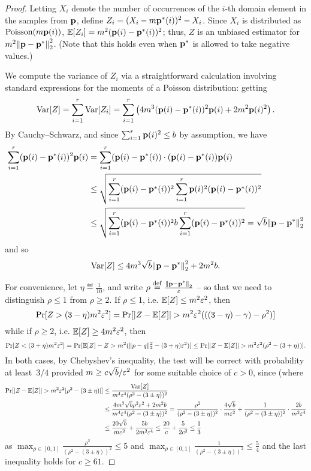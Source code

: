 \begin{proof}Letting $X_i$ denote the number of occurrences of the $i$-th domain element in the samples from $\mathbf{p}$, define $Z_i=(X_i-m\mathbf{p}^\ast(i))^2-X_i$. Since $X_i$ is distributed as $\operatorname{Poisson}\!\left( m \mathbf{p}(i) \right) $,  $\mathbb{E}[Z_i] = m^2(\mathbf{p}(i) - \mathbf{p}^\ast(i))^2$; thus, $Z$ is an unbiased estimator for $m^2{\lVert \mathbf{p}-\mathbf{p}^\ast {\rVert}}_2^2$. (Note that this holds even when $\mathbf{p}^\ast$ is allowed to take negative values.)

We compute the variance of $Z_i$ via a straightforward calculation involving standard expressions for the moments of a Poisson distribution: getting
\[
  \operatorname{Var}[Z]  = \sum_{i=1}^r \operatorname{Var}[Z_i] = \sum_{i=1}^r \left(4m^3(\mathbf{p}(i)-\mathbf{p}^\ast(i))^2 \mathbf{p}(i)  + 2m^2\mathbf{p}(i)^2\right).
\]
By Cauchy--Schwarz, and since $\sum_{i=1}^r \mathbf{p}(i)^2 \leq b$ by assumption, we have 
\begin{align*}
\sum_{i=1}^r (\mathbf{p}(i)-\mathbf{p}^\ast(i))^2 \mathbf{p}(i) &= \sum_{i=1}^r (\mathbf{p}(i)-\mathbf{p}^\ast(i))\cdot (\mathbf{p}(i)-\mathbf{p}^\ast(i)) \mathbf{p}(i)  \\
&\leq \sqrt{\sum_{i=1}^r (\mathbf{p}(i)-\mathbf{p}^\ast(i)) ^2 \sum_{i=1}^r \mathbf{p}(i)^2(\mathbf{p}(i)-\mathbf{p}^\ast(i))^2} \\
&\leq \sqrt{\sum_{i=1}^r (\mathbf{p}(i)-\mathbf{p}^\ast(i)) ^2 b \sum_{i=1}^r (\mathbf{p}(i)-\mathbf{p}^\ast(i)) ^2}
 = \sqrt{b} {\lVert \mathbf{p}-\mathbf{p}^\ast {\rVert}}_2^2
\end{align*}
and so 
 \[
 \operatorname{Var}[Z] \leq 4 m^3 \sqrt{b} {\lVert \mathbf{p}-\mathbf{p}^\ast {\rVert}}_2^2 + 2 m^2 b.
 \]
 
\noindent For convenience, let $\eta\eqdef\frac{1}{10}$, and write $\rho \stackrel{\rm def}{=} \frac{{\lVert \mathbf{p}-\mathbf{p}^\ast {\rVert}}_2}{\varepsilon}$ -- so that we need to distinguish $\rho \leq 1$ from $\rho \geq 2$. If $\rho \leq 1$, i.e. $\mathbb{E}[Z] \leq m^2\varepsilon^2$, then 
 \[
    \Pr[ Z > (3-\eta)m^2\varepsilon^2 ] = \Pr[ \lvert Z - \mathbb{E}[Z] \rvert > m^2\varepsilon^2( ((3-\eta)-\gamma) - \rho^2 ) ]
 \]
 while if $\rho \geq 2$, i.e. $\mathbb{E}[Z] \geq 4m^2\varepsilon^2$, then
 \[
    \Pr[ Z < (3+\eta)m^2\varepsilon^2 ] = \Pr[ \mathbb{E}[Z] - Z > m^2( \lVert p-q\rVert_2^2 - (3+\eta)\varepsilon^2 ) ] \leq \Pr[ \lvert Z - \mathbb{E}[Z] \rvert > m^2\varepsilon^2( \rho^2 - (3+\eta) ) ].
 \]
In both cases, by Chebyshev's inequality, the test will be correct with probability at least~$3/4$ provided $m \geq c\sqrt{b}/\varepsilon^2$ for some suitable choice of $c > 0$, since (where
\begin{align*}
    \Pr[ \lvert Z - \mathbb{E}[Z] \rvert > m^2\varepsilon^2\lvert \rho^2 - (3\pm\eta) \rvert ] 
    &\leq \frac{\operatorname{Var}[Z]}{m^4\varepsilon^4( \rho^2 - (3\pm\eta) )^2} \\
    &\leq \frac{ 4m^3 \sqrt{b} \rho^2\varepsilon^2 + 2 m^2 b }{m^4\varepsilon^4( \rho^2 - (3\pm\eta) )^2} 
    = \frac{\rho^2}{(\rho^2 - (3\pm\eta) )^2}\cdot\frac{ 4\sqrt{b}}{m\varepsilon^2} + \frac{1}{(\rho^2 - (3\pm\eta) )^2}\cdot\frac{2 b }{m^2\varepsilon^4} \\
    &\leq \frac{ 20\sqrt{b}}{m\varepsilon^2} + \frac{5 b }{2m^2\varepsilon^4}  \leq \frac{20}{c}+\frac{5}{2c^2} \leq \frac{1}{3}
\end{align*}
as $\max_{\rho\in[0,1]} \frac{\rho^2}{(\rho^2 - (3\pm\eta) )^2} \leq 5$ and $\max_{\rho\in[0,1]} \frac{1}{(\rho^2 - (3\pm\eta) )^2} \leq \frac{5}{4}$ and the last inequality holds for $c \geq 61$.
\end{proof}

